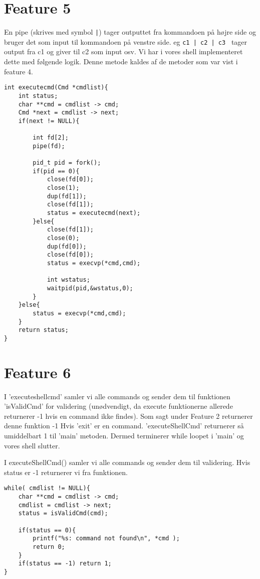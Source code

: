 \documentclass[danish]{report}
\begin{document}
\section{Feature 5}

En pipe (skrives med symbol {\tt |}) tager outputtet fra kommandoen på højre side og bruger det som input til kommandoen på venstre side. eg {\tt c1 | c2 | c3 } tager output fra c1 og giver til c2 som input osv. Vi har i vores shell implementeret dette med følgende logik. Denne metode kaldes af de metoder som var vist i feature 4.

\begin{lstlisting}
int executecmd(Cmd *cmdlist){
    int status;
    char **cmd = cmdlist -> cmd;
    Cmd *next = cmdlist -> next;
    if(next != NULL){

        int fd[2];
        pipe(fd);

        pid_t pid = fork();
        if(pid == 0){
            close(fd[0]);
            close(1);
            dup(fd[1]);
            close(fd[1]);
            status = executecmd(next);
        }else{
            close(fd[1]);
            close(0);
            dup(fd[0]);
            close(fd[0]);
            status = execvp(*cmd,cmd);
            
            int wstatus;
            waitpid(pid,&wstatus,0);
        }
    }else{
        status = execvp(*cmd,cmd);
    }
    return status;
}

\end{lstlisting}

\section{Feature 6}


I 'executeshellcmd' samler vi alle commands og sender dem til funktionen 'isValidCmd' for validering (unødvendigt, da execute funktionerne allerede returnerer -1 hvis en command ikke findes). Som sagt under Feature 2 returnerer denne funktion -1 Hvis 'exit' er en command. 'executeShellCmd' returnerer så umiddelbart 1 til 'main' metoden. Dermed terminerer while loopet i 'main' og vores shell slutter. 

I executeShellCmd() samler vi alle commands og sender dem til validering. Hvis status er -1 returnerer vi fra funktionen.

\begin{lstlisting}
while( cmdlist != NULL){
	char **cmd = cmdlist -> cmd;
	cmdlist = cmdlist -> next;
	status = isValidCmd(cmd);

	if(status == 0){ 
		printf("%s: command not found\n", *cmd );
		return 0;
	}
	if(status == -1) return 1;
}
\end{lstlisting}
\end{document}

